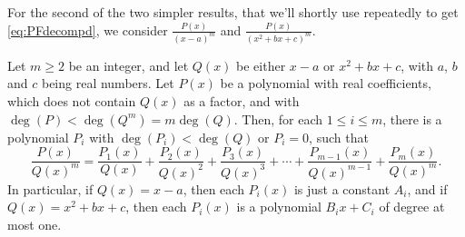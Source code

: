 For the second of the two simpler results, that we'll shortly use repeatedly to get \eqref{eq:PFdecompd}, we consider $\frac{P(x)}{(x-a)^m}$
and $\frac{P(x)}{{(x^2+bx+c)}^m}$.
\begin{lemma}\label{lemPFpower}
Let $m\ge 2$ be an integer, and let $Q(x)$ be either $x-a$ or $x^2+bx+c$, with $a$, $b$ and $c$ being real numbers. 
Let $P(x)$ be a polynomial with real coefficients, which does not contain $Q(x)$ as a factor, and
with $\deg(P)<\deg(Q^m)=m\deg(Q)$. Then, for each $1\le i\le m$, there is a
polynomial $P_i$ with $\deg(P_i)<\deg(Q)$ or $P_i=0$, such that 
\begin{equation*}
\frac{P(x)}{Q(x)^m}
=\frac{P_1(x)}{Q(x)}+\frac{P_2(x)}{Q(x)^2}+\frac{P_3(x)}{Q(x)^3}+\cdots
         +\frac{P_{m-1}(x)}{Q(x)^{m-1}}+\frac{P_{m}(x)}{Q(x)^m}.
\end{equation*}
In particular, if $Q(x) =x-a$, then each $P_i(x)$ is just a constant $A_i$,
and if  $Q(x) =x^2+bx+c$, then each $P_i(x)$ is a polynomial 
$B_i x+ C_i$ of degree at most one.
\end{lemma}
